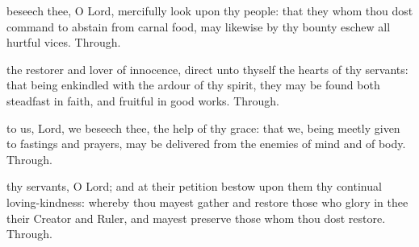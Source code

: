 
\mattins



{} beseech thee, O Lord, mercifully look upon thy people: that they whom thou dost command to abstain from carnal food, may likewise by thy bounty eschew all hurtful vices. Through.

\secondEvensong



 the restorer and lover of innocence, direct unto thyself the hearts of thy servants: that being enkindled with the ardour of thy spirit, they may be found both steadfast in faith, and fruitful in good works. Through.


\clearpage
{}

\mattins



{} to us, Lord, we beseech thee, the help of thy grace: that we, being meetly given to fastings and prayers, may be delivered from the enemies of mind and of body. Through.

\secondEvensong



 thy servants, O Lord; and at their petition bestow upon them thy continual loving-kindness: whereby thou mayest gather and restore those who glory in thee their Creator and Ruler, and mayest preserve those whom thou dost restore. Through.


